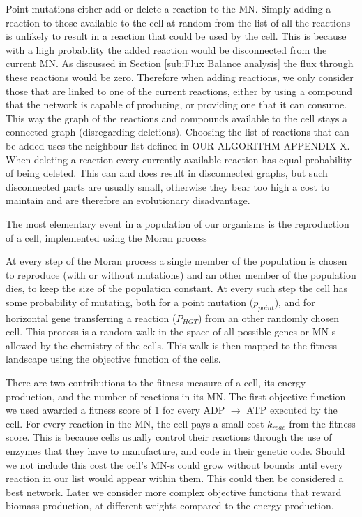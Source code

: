 \documentclass[a4paper,12pt]{article}
\begin{document}
	Point mutations either add or delete a reaction to the MN. Simply adding a reaction to those available to the cell at random from the list of all the reactions is unlikely to result in a reaction that could be used by the cell. This is because with a high probability the added reaction would be disconnected from the current MN. As discussed in Section \ref{sub:Flux Balance analysis} the flux through these reactions would be zero. Therefore when adding reactions, we only consider those that are linked  to one of the current reactions, either by using a compound that  the network is capable of producing, or providing one that it can consume. %
	This way the graph of the reactions and compounds available to the cell stays a connected graph (disregarding deletions). Choosing the list of reactions that can be added uses the neighbour-list defined in OUR ALGORITHM APPENDIX X. When deleting a reaction every currently available reaction has equal probability of being deleted. This can and does result in disconnected graphs, but such disconnected parts are usually small, otherwise they bear too high a cost to maintain and are therefore an evolutionary disadvantage.
	
The most elementary event in a population of our organisms is the reproduction of a cell, implemented using the Moran process \cite{moranprocess} 

At every step of the Moran process a single member of the population is chosen to reproduce (with or without mutations) and an other member of the population dies, to keep the size of the population constant. At every such step the cell has some probability of mutating, both for a point mutation ($p_{point}$), and for horizontal gene transferring a reaction ($P_{HGT}$) from an other randomly chosen cell.  This process is a random walk in the space of all possible genes or MN-s allowed by the chemistry of the cells.  This walk is then mapped to the fitness landscape using the objective function of the cells.

There are two contributions to the fitness measure of a cell, its energy production, and the number of reactions in its MN.  The first objective function we used awarded a fitness score of $1$ for every ADP $\rightarrow$ ATP executed by the cell. For every reaction in the MN, the cell pays a small cost $k_{reac}$  from the fitness score. This is because cells usually control their reactions through the use of enzymes that they have to manufacture, and code in their genetic code. Should we not include this cost the cell's MN-s could grow without bounds until every reaction in our list would appear within them. This could then be considered a best network. Later we consider more complex objective functions that reward biomass production, at different weights compared to the energy production. 
\end{document}
